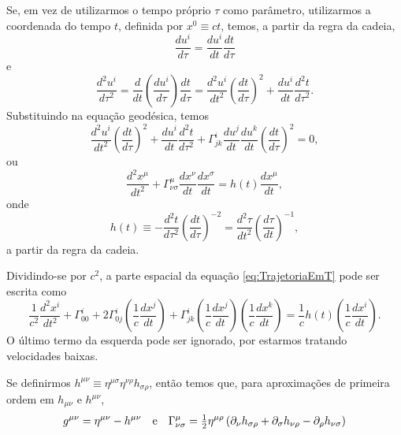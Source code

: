 Se, em vez de utilizarmos o tempo próprio $ \tau $ como parâmetro, utilizarmos a coordenada do tempo $ t $, definida por $ x^0 \equiv ct $, temos, a partir da regra da cadeia,
\[
\frac{du^i}{d\tau}=\frac{du^i}{dt}\frac{dt}{d\tau}
\]
e
\[
	\frac{d^2u^i}{d\tau^2}=\frac{d}{dt}\left( \frac{du^i}{d\tau} \right)\frac{dt}{d\tau} = \frac{d^2u^i}{dt^2}\left( \frac{dt}{d\tau} \right)^2 + \frac{du^i}{dt}\frac{d^2t}{d\tau^2}.
\]
Substituindo na equação geodésica, temos
\[
	\frac{d^2u^i}{dt^2}\left( \frac{dt}{d\tau} \right)^2 + \frac{du^i}{dt}\frac{d^2t}{d\tau^2} + \Gamma^i_{jk} \frac{du^j}{dt}\frac{du^k}{dt}\left( \frac{dt}{d\tau} \right)^2 = 0 ,
\]
ou
\begin{equation}\label{eq:TrajetoriaEmT}
\frac{d^{2} x^{\mu}}{d t^{2}}+\Gamma_{\nu \sigma}^{\mu} \frac{d x^{\nu}}{d t} \frac{d x^{\sigma}}{d t}=h(t) \frac{d x^{\mu}}{d t} ,
\end{equation}
onde
\begin{equation}\label{eq:HDefinicao}
h(t) \equiv-\frac{d^{2} t}{d \tau^{2}}\left(\frac{d t}{d \tau}\right)^{-2}=\frac{d^{2} \tau}{d t^{2}}\left(\frac{d \tau}{d t}\right)^{-1},
\end{equation}
a partir da regra da cadeia.


Dividindo-se por $ c^2 $, a parte espacial da equação \eqref{eq:TrajetoriaEmT} pode ser escrita como
\begin{equation}\label{eq:TrajetoriaParteEspacial}
\frac{1}{c^{2}} \frac{d^{2} x^{i}}{d t^{2}}+\Gamma_{00}^{i}+2 \Gamma_{0 j}^{i}\left(\frac{1}{c} \frac{d x^{j}}{d t}\right)+\Gamma_{j k}^{i}\left(\frac{1}{c} \frac{d x^{j}}{d t}\right)\left(\frac{1}{c} \frac{d x^{k}}{d t}\right)=\frac{1}{c} h(t)\left(\frac{1}{c} \frac{d x^{i}}{d t}\right).
\end{equation}
O último termo da esquerda pode ser ignorado, por estarmos tratando velocidades baixas.

Se definirmos $ h^{\mu \nu} \equiv \eta^{\mu \sigma} \eta^{\nu \rho} h_{\sigma \rho} $, então temos que, para aproximações de primeira ordem em $ h_{\mu \nu} \text { e } h^{\mu \nu} $,
\begin{equation}\label{eq:HCovariante}
g^{\mu \nu}=\eta^{\mu \nu}-h^{\mu \nu} \qq{e} \Gamma_{\nu \sigma}^{\mu}=\tfrac{1}{2} \eta^{\mu \rho}\left(\partial_{\nu} h_{\sigma \rho}+\partial_{\sigma} h_{\nu \rho}-\partial_{\rho} h_{\nu \sigma}\right)
\end{equation}


